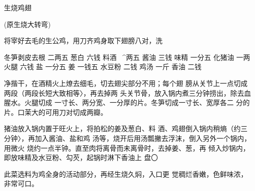 \begin{recipe}{生烧鸡翅}

(原生烧大转弯)

\ingredients



\cooking

\step 将宰好去毛的生公鸡，用刀齐鸡身取下翅膀八对，洗

冬笋剥皮去根	二两五	葱白	六钱
料酒	~^两五	酱油	三钱
味精	一分五	化猪油	一两
火腿	六钱	盐	一分五
姜	一钱五	水豆粉	二钱
鸡汤	一斤	香油	二钱

净揩干，在酒精火上燎去细毛，切去翅尖部分不用；每个翅 膀从关节上一点切成两段（两段长短大致相等〉，再去掉两 头关节骨，放入锅内煮三分钟捞出，除去血腥水。火腿切成 一寸长、两分宽、一分厚的片。冬笋切成一寸长、宽厚各二 分的片。口茉大的可用刀对切成两瓣。

\step 猪油放入锅内置于旺火上，将拍松的姜及葱白、料 酒、鸡翅倒入锅内稍熵（约三分钟〉，再加入酱油、盐和鸡 汤等，烧开后用汤瓢撇去浮沫，倒入另外一个锅内，用微火 烧约一点半钟。直至肉将离骨而未离骨时，去掉姜、葱，再 倾入炒锅内，即放味精及水豆粉、勾芡，起锅时淋下香油上 盘〇

\notes

此菜选料为鸡全身的活动部分，再经生烧久焖，入口更 觉稠烂香嫩，色鲜味浓，非常可口。

\end{recipe}

